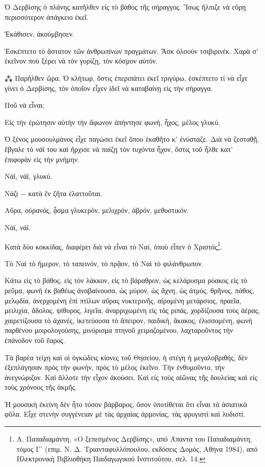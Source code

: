 \documentclass{article}
\begin{document}
Ὁ Δερβίσης ὁ πλάνης κατῆλθεν εἰς τὸ βάθος τῆς σήραγγος. Ἴσως ἤλπιζε νὰ εὕρῃ περισσότερον ἀπάγκειο ἐκεῖ.

Ἐκάθισεν, ἀκούμβησεν.

Ἐσκέπτετο τὸ ἄστατον τῶν ἀνθρωπίνων πραγμάτων. Ἄσκ ὀλσοὺν τσιβιρινέκ. Χαρὰ σ' ἐκεῖνον ποὺ ξέρει νὰ τὸν γυρίζῃ, τὸν κόσμον αὐτόν.

⁂
Παρῆλθεν ὥρα. Ὁ κλήτωρ, ὅστις ἐπεριπάτει ἐκεῖ τριγύρω, ἐσκέπτετο τί νὰ εἶχε γίνει ὁ Δερβίσης, τὸν ὁποῖον εἶχεν ἰδεῖ νὰ καταβαίνῃ εἰς τὴν σήραγγα.

Ποῦ νὰ εἶναι;

Εἰς τὴν ἐρώτησιν αὐτὴν τὴν ἄφωνον ἀπήντησε φωνή, ἦχος, μέλος γλυκύ.

Ὁ ξένος μουσουλμάνος εἶχε παγώσει ἐκεῖ ὅπου ἐκαθῆτο κ' ἐνύσταζε. Διὰ νὰ ζεσταθῇ, ἔβγαλε τὸ νάϊ του καὶ ἤρχισε νὰ παίζῃ τὸν τυχόντα ἦχον, ὅστις τοῦ ἦλθε κατ' ἐπιφορὰν εἰς τὴν μνήμην.

Νάϊ, νάϊ, γλυκύ.

Νάζι − κατὰ ἓν ζῆτα ἐλαττοῦται.

Αὔρα, οὐρανός, ᾆσμα γλυκερόν, μελιχρόν, ἁβρόν, μεθυστικόν.

Νάϊ, νάϊ.

Κατὰ δύο κοκκίδας, διαφέρει διὰ νὰ εἶναι τὸ Ναί, ὁποὺ εἶπεν ὁ Χριστός\footnote{Α. Παπαδιαμάντη, «Ο ξεπεσμένος Δερβίσης», από  Άπαντα του Παπαδιαμάντη, τόμος Γ΄ (επιμ. Ν. Δ. Τριανταφυλλόπουλου, εκδόσεις Δομός, Αθήνα 1984), από Ηλεκτρονική Βιβλιοθήκη Παιδαγωγικού Ινστιτούτου, σελ. 14.}.

Τὸ Ναὶ τὸ ἥμερον, τὸ ταπεινόν, τὸ πρᾷον, τὸ Ναὶ τὸ φιλάνθρωπον.

Κάτω εἰς τὸ βάθος, εἰς τὸν λάκκον, εἰς τὸ βάραθρον, ὡς κελάρυσμα ρύακος εἰς τὸ ρεῦμα, φωνὴ ἐκ βαθέως ἀναβαίνουσα, ὡς μύρον, ὡς ἄχνη, ὡς ἀτμός, θρῆνος, πάθος, μελῳδία, ἀνερχομένη ἐπὶ πτίλων αὔρας νυκτερινῆς, αἰρομένη μετάρσιος, πραεῖα, μειλιχία, ἄδολος, ψίθυρος, λιγεῖα, ἀναρριχωμένη εἰς τὰς ριπάς, χορδίζουσα τοὺς ἀέρας, χαιρετίζουσα τὸ ἀχανές, ἱκετεύουσα τὸ ἄπειρον, παιδική, ἄκακος, ἑλισσομένη, φωνὴ παρθένου μοιρολογούσης, μινύρισμα πτηνοῦ χειμαζομένου, λαχταροῦντος τὴν ἐπάνοδον τοῦ ἔαρος.

Τὰ βαρέα τείχη καὶ οἱ ὀγκώδεις κίονες τοῦ Θησείου, ἡ στέγη ἡ μεγαλοβριθής, δὲν ἐξεπλάγησαν πρὸς τὴν φωνήν, πρὸς τὸ μέλος ἐκεῖνο. Τὴν ἐνθυμοῦντο, τὴν ἀνεγνώριζον. Καὶ ἄλλοτε τὴν εἶχον ἀκούσει. Καὶ εἰς τοὺς αἰῶνας τῆς δουλείας καὶ εἰς τοὺς χρόνους τῆς ἀκμῆς.

Ἡ μουσικὴ ἐκείνη δὲν ἦτο τόσον βάρβαρος, ὅσον ὑποτίθεται ὅτι εἶναι τὰ ἀσιατικὰ φῦλα. Εἶχε στενὴν συγγένειαν μὲ τὰς ἀρχαίας ἁρμονίας, τὰς φρυγιστὶ καὶ λυδιστί.
\end{document}
